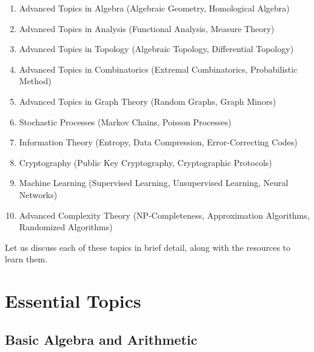 \documentclass[openany]{book}
\begin{document}
\begin{itemize}
\begin{enumerate}
        \item Advanced Topics in Algebra (Algebraic Geometry, Homological Algebra)
        \item Advanced Topics in Analysis (Functional Analysis, Measure Theory)
        \item Advanced Topics in Topology (Algebraic Topology, Differential Topology)
        \item Advanced Topics in Combinatorics (Extremal Combinatorics, Probabilistic Method)
        \item Advanced Topics in Graph Theory (Random Graphs, Graph Minors)
        \item Stochastic Processes (Markov Chains, Poisson Processes)
        \item Information Theory (Entropy, Data Compression, Error-Correcting Codes)
        \item Cryptography (Public Key Cryptography, Cryptographic Protocols)
        \item Machine Learning (Supervised Learning, Unsupervised Learning, Neural Networks)
        \item Advanced Complexity Theory (NP-Completeness, Approximation Algorithms, Randomized Algorithms)
    \end{enumerate}
\end{itemize}
Let us discuss each of these topics in brief detail, along with the resources to learn them.
\newpage

\chapter{Essential Topics}
\section{Basic Algebra and Arithmetic}
\end{document}
